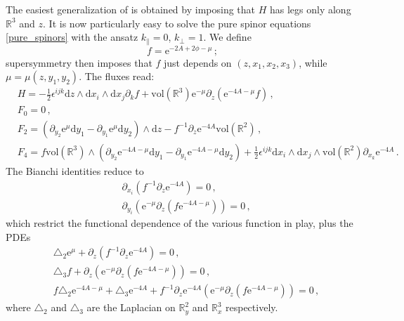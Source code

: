 \documentclass[12pt]{article}
\newcommand{\R}{\mathbb{R}}
\newcommand{\dd}{\mathrm{d}}
\newcommand{\e}{\mathrm{e}}
\newcommand{\vol}{\mathrm{vol}}
\begin{document}
The easiest generalization of \cite[App.~C]{l-macpherson} is obtained by imposing that $H$ has legs only along $\R^3$ and $z$. It is now particularly easy to solve the pure spinor equations \eqref{pure_spinors} with the ansatz $k_\parallel= 0$, $k_\perp = 1$. 
We define
\begin{equation}
\label{eq:phi_f}
f = \e^{-2A+2\phi-\mu}\,;
\end{equation}
supersymmetry then imposes that $f$ just depends on $(z,x_1,x_2,x_3)$, while $\mu = \mu(z,y_1,y_2)$.
The fluxes read:
\begin{subequations}
	\label{susyIIA_fluxes}
	\begin{align}
	&H= - \frac{1}{2} \epsilon^{ijk} \dd z \wedge \dd x_i \wedge \dd x_j \partial_k f + \vol(\R^3) \e^{-\mu}  \partial_z (\e^{-4A-\mu} f) \, , \label{eq:susyIIA_H} \\
	&F_0 =0 \, ,\\
	&F_2 = \left( \partial_{y_2}\e^{\mu} \dd y_1 -\partial_{y_1}\e^{\mu} \dd y_2 \right) \wedge \dd z - f^{-1} \partial_z \e^{-4A} \vol(\R^2)  \, ,\\
	&F_4= f \vol(\R^3)\wedge  \left( \partial_{y_2}\e^{-4A-\mu} \dd y_1 - \partial_{y_1}\e^{-4A-\mu} \dd y_2 \right) + \frac{1}{2} \epsilon^{ijk} \dd x_i \wedge \dd x_j \wedge \vol(\R^2) \partial_{x_k} \e^{-4A} \, .
\end{align}
\end{subequations}
The Bianchi identities reduce to 
\begin{subequations}
	\label{eq:largerIIA_BI1}
	\begin{align}
	&\partial_{x_i} \left( f^{-1} \partial_z \e^{-4A} \right) =0 \, , \\
	&\partial_{y_i} \left(\e^{-\mu} \partial_{z} (f \e^{-4A-\mu}) \right) =0 \, ,
	\end{align}
\end{subequations}
which restrict the functional dependence of the various function in play, plus the PDEs
\begin{subequations}
	\label{eq:largerIIA_BI2}
	\begin{align}
	&\triangle_2 \e^{\mu} +\partial_{z} \left( f^{-1} \partial_z \e^{-4A} \right) =0 \, , \\
	&\triangle_3 f + \partial_z \left(\e^{-\mu} \partial_{z} (f \e^{-4A-\mu}) \right) = 0 \, , \\
	&f \triangle_2 \e^{-4A-\mu} + \triangle_3 \e^{-4A} + f^{-1} \partial_{z}\e^{-4A}  \left(\e^{-\mu} \partial_{z} (f \e^{-4A-\mu}) \right) = 0 \, ,
	\end{align}
\end{subequations}
where $\triangle_2$ and $\triangle_3$ are the Laplacian on $\R^2_y$ and $\R^3_x$ respectively.
\end{document}
